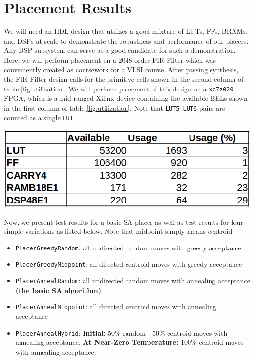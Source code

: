 \section{Placement Results}
\label{sec:results}


We will need an HDL design that utilizes a good mixture of LUTs, FFs, BRAMs, and DSPs at scale to demonstrate the robustness and performance of our placers. 
Any DSP subsystem can serve as a good candidate for such a demonstration. 
Here, we will perform placement on a 2048-order FIR Filter which was conveniently created as coursework for a VLSI course. 
After passing synthesis, the FIR Filter design calls for the primitive cells shown in the second column of table \ref{fig:utilization}.
We will perform placement of this design on a \texttt{xc7z020} FPGA, which is a mid-ranged Xilinx device containing the available BELs shown in the first column of table \ref{fig:utilization}.
Note that \texttt{LUT5-LUT6} pairs are counted as a single \texttt{LUT}.

\vspace{0.5cm}
{
    \centering
    \includegraphics[width=0.8\columnwidth]{figures/results/utilization.png}
    \label{fig:utilization}
}
\vspace{0.5cm}

Now, we present test results for a basic SA placer as well as test results for four simple variations as listed below. 
Note that midpoint simply means centroid.

\begin{itemize}
    \item \texttt{PlacerGreedyRandom}: all undirected random moves with greedy acceptance
    \item \texttt{PlacerGreedyMidpoint}: all directed centroid moves with greedy acceptance
    \item \texttt{PlacerAnnealRandom}: all undirected random moves with annealing acceptance \textbf{(the basic SA algorithm)}
    \item \texttt{PlacerAnnealMidpoint}: all directed centroid moves with annealing acceptance
    \item \texttt{PlacerAnnealHybrid}: \textbf{Initial:} 50\% random - 50\% centroid moves with annealing acceptance. \textbf{At Near-Zero Temperature:} 100\% centroid moves with annealing acceptance.
\end{itemize}

